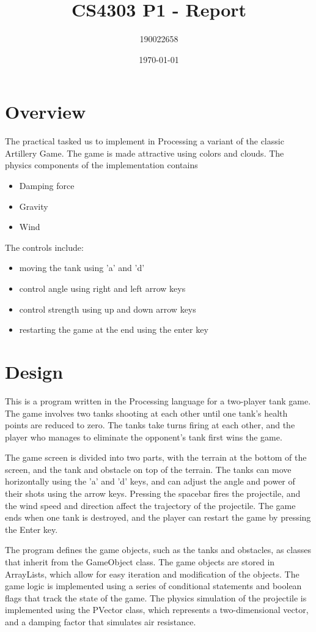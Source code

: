 \documentclass[11pt]{article}
\author{190022658}
\date{\today}
\title{CS4303 P1 - Report}
\begin{document}
\maketitle

\section{Overview}
\label{sec:org5d2902f}
The practical tasked us to implement in Processing a variant of the classic Artillery Game. The game is made attractive using colors and clouds. The physics components of the implementation contains
\begin{itemize}
\item Damping force
\item Gravity
\item Wind
\end{itemize}
The controls include:
\begin{itemize}
\item moving the tank using 'a' and 'd'
\item control angle using right and left arrow keys
\item control strength using up and down arrow keys
\item restarting the game at the end using the enter key
\end{itemize}

\section{Design}
\label{sec:orga5b62d1}
This is a program written in the Processing language for a two-player tank game. The game involves two tanks shooting at each other until one tank's health points are reduced to zero. The tanks take turns firing at each other, and the player who manages to eliminate the opponent's tank first wins the game.

The game screen is divided into two parts, with the terrain at the bottom of the screen, and the tank and obstacle on top of the terrain. The tanks can move horizontally using the 'a' and 'd' keys, and can adjust the angle and power of their shots using the arrow keys. Pressing the spacebar fires the projectile, and the wind speed and direction affect the trajectory of the projectile. The game ends when one tank is destroyed, and the player can restart the game by pressing the Enter key.

The program defines the game objects, such as the tanks and obstacles, as classes that inherit from the GameObject class. The game objects are stored in ArrayLists, which allow for easy iteration and modification of the objects. The game logic is implemented using a series of conditional statements and boolean flags that track the state of the game. The physics simulation of the projectile is implemented using the PVector class, which represents a two-dimensional vector, and a damping factor that simulates air resistance.
\end{document}
